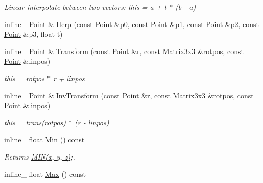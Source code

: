 \begin{DoxyCompactItemize}
\begin{DoxyCompactList}\small\item\em Linear interpolate between two vectors\+: this = a + t $\ast$ (b -\/ a) \end{DoxyCompactList}\item 
inline\+\_\+ \hyperlink{classOpcode_1_1Point}{Point} \& \hyperlink{classOpcode_1_1Point_aacadb928e94932965cf96ebef6375af3}{Herp} (const \hyperlink{classOpcode_1_1Point}{Point} \&p0, const \hyperlink{classOpcode_1_1Point}{Point} \&p1, const \hyperlink{classOpcode_1_1Point}{Point} \&p2, const \hyperlink{classOpcode_1_1Point}{Point} \&p3, float t)
\item 
inline\+\_\+ \hyperlink{classOpcode_1_1Point}{Point} \& \hyperlink{classOpcode_1_1Point_a3425161ffac8c9a2b7fc5ab0c0c02483}{Transform} (const \hyperlink{classOpcode_1_1Point}{Point} \&r, const \hyperlink{classOpcode_1_1Matrix3x3}{Matrix3x3} \&rotpos, const \hyperlink{classOpcode_1_1Point}{Point} \&linpos)\hypertarget{classOpcode_1_1Point_a3425161ffac8c9a2b7fc5ab0c0c02483}{}\label{classOpcode_1_1Point_a3425161ffac8c9a2b7fc5ab0c0c02483}

\begin{DoxyCompactList}\small\item\em this = rotpos $\ast$ r + linpos \end{DoxyCompactList}\item 
inline\+\_\+ \hyperlink{classOpcode_1_1Point}{Point} \& \hyperlink{classOpcode_1_1Point_a3cc634ec4306c0ea6b9f319d084b2879}{Inv\+Transform} (const \hyperlink{classOpcode_1_1Point}{Point} \&r, const \hyperlink{classOpcode_1_1Matrix3x3}{Matrix3x3} \&rotpos, const \hyperlink{classOpcode_1_1Point}{Point} \&linpos)\hypertarget{classOpcode_1_1Point_a3cc634ec4306c0ea6b9f319d084b2879}{}\label{classOpcode_1_1Point_a3cc634ec4306c0ea6b9f319d084b2879}

\begin{DoxyCompactList}\small\item\em this = trans(rotpos) $\ast$ (r -\/ linpos) \end{DoxyCompactList}\item 
inline\+\_\+ float \hyperlink{classOpcode_1_1Point_a8c69a460a866e8db7934b629a9d7496b}{Min} () const \hypertarget{classOpcode_1_1Point_a8c69a460a866e8db7934b629a9d7496b}{}\label{classOpcode_1_1Point_a8c69a460a866e8db7934b629a9d7496b}

\begin{DoxyCompactList}\small\item\em Returns \hyperlink{IceTypes_8h_a3acffbd305ee72dcd4593c0d8af64a4f}{M\+I\+N(x, y, z)};. \end{DoxyCompactList}\item 
inline\+\_\+ float \hyperlink{classOpcode_1_1Point_af0c040e368dddc9003f9693690cffb93}{Max} () const \hypertarget{classOpcode_1_1Point_af0c040e368dddc9003f9693690cffb93}{}\label{classOpcode_1_1Point_af0c040e368dddc9003f9693690cffb93}


\end{DoxyCompactItemize}
